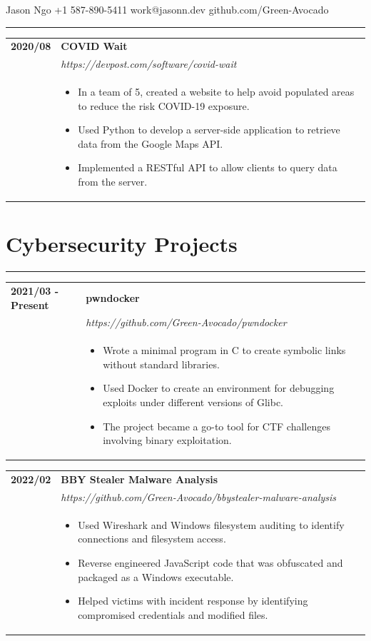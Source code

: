 \documentclass[letterpaper]{article}
\makeatletter
\newcommand{\sectcolor}{cyan}
\newcommand{\sect}[1]{\section*{#1}
                        {\color{\sectcolor}
                        \rule{\textwidth}{1pt}
                        \vspace{-1ex}}}
\newcommand{\secondpage}{\pagebreak
                            {\small
                                Jason Ngo
                                \hfill
                                +1 587-890-5411
                                \hfill
                                work@jasonn.dev
                                \hfill
                                github.com/Green-Avocado
                            }
                            \vspace{-4pt}

                            \rule{\textwidth}{0.1pt}

                            \vspace{0.2in}}
\makeatother
\begin{document}
    \secondpage

        \begin{tabular}{p{} p{}}
            \textbf{2020/08} & \textbf{COVID Wait} \\
            & \emph{https://devpost.com/software/covid-wait} \\
            & \begin{itemize}
                \item In a team of 5, created a website to help avoid populated areas to reduce the risk
                    COVID-19 exposure.
                \item Used Python to develop a server-side application to retrieve data from the Google
                    Maps API.
                \item Implemented a RESTful API to allow clients to query data from the server.
            \end{itemize}
        \end{tabular}

    \sect{Cybersecurity Projects}

        \begin{tabular}{p{} p{}}
            \textbf{2021/03 - Present} & \textbf{pwndocker} \\
            & \emph{https://github.com/Green-Avocado/pwndocker} \\
            & \begin{itemize}
                \item Wrote a minimal program in C to create symbolic links without standard libraries.
                \item Used Docker to create an environment for debugging exploits under different
                    versions of Glibc.
                \item The project became a go-to tool for CTF challenges involving binary exploitation.
            \end{itemize}
        \end{tabular}

        \begin{tabular}{p{} p{}}
            \textbf{2022/02} & \textbf{BBY Stealer Malware Analysis} \\
            & \emph{https://github.com/Green-Avocado/bbystealer-malware-analysis} \\
            & \begin{itemize}
                \item Used Wireshark and Windows filesystem auditing to identify connections and
                    filesystem access.
                \item Reverse engineered JavaScript code that was obfuscated and packaged as a Windows
                    executable.
                \item Helped victims with incident response by identifying compromised credentials and
                    modified files.
            \end{itemize}
        \end{tabular}
\end{document}

